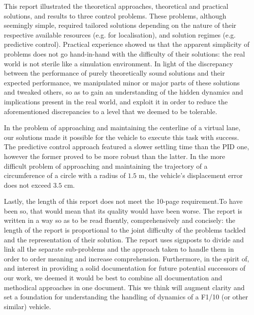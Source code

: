 This report illustrated the theoretical approaches, theoretical and
practical solutions, and results to three control problems. These problems,
although seemingly simple, required tailored solutions depending on the
nature of their respective available resources (e.g. for localisation),
and solution regimes (e.g. predictive control). Practical experience showed us
that the apparent simplicity of problems does not go hand-in-hand with the
difficulty of their solutions: the real world is not sterile like a simulation
environment. In light of the discrepancy between the performance of purely
theoretically sound solutions and their expected performance, we manipulated
minor or major parts of these solutions and tweaked others, so as to gain an
understanding of the hidden dynamics and implications present in the real world,
and exploit it in order to reduce the aforementioned discrepancies to a level
that we deemed to be tolerable.

In the problem of approaching and maintaining the centerline of a virtual
lane, our solutions made it possible for the vehicle to execute this task
with success. The predictive control approach featured a slower settling time
than the PID one, however the former proved to be more robust than the latter.
In the more difficult problem of approaching and maintaining the trajectory
of a circumference of a circle with a radius of $1.5$ m, the vehicle's
displacement error does not exceed $3.5$ cm.

Lastly, the length of this report does not meet the 10-page requirement.To
have been so, that would mean that its quality would have been worse. The
report is written in a way so as to be read fluently, comprehensively and
concisely: the length of the report is proportional to the joint difficulty of
the problems tackled and the representation of their solution. The report uses
signposts to divide and link all the separate sub-problems and the approach
taken to handle them in order to order meaning and increase comprehension.
Furthermore, in the spirit of, and interest in providing a solid documentation
for future potential successors of our work, we deemed it would be best to
combine all documentation and methodical approaches in one document. This we
think will augment clarity and set a foundation for understanding the handling
of dynamics of a F1/10 (or other similar) vehicle.
